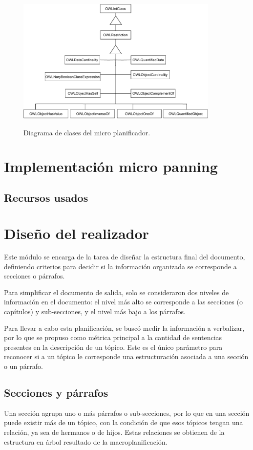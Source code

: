 \begin{figure}[H]
    \centering
    \includegraphics[width=10cm, height=7cm]{img/generacion_documento/diagrama_clases_microplanificador.pdf}
    \caption{Diagrama de clases del micro planificador.}
    \label{fig:diagrama_clases_microplanificador}
\end{figure}


\section{Implementación micro panning}

\subsection{Recursos usados}

\section{Diseño del realizador}
Este módulo se encarga de la tarea de diseñar la estructura final del documento, definiendo criterios para decidir si la información organizada se corresponde a secciones o párrafos.

Para simplificar el documento de salida, solo se consideraron dos niveles de información en el documento: el nivel más alto se corresponde a las secciones (o capítulos) y sub-secciones, y el nivel más bajo a los párrafos. 

Para llevar a cabo esta planificación, se buscó medir la información a verbalizar, por lo que se propuso como métrica principal a la cantidad de sentencias presentes en la descripción de un tópico. Este es el único parámetro para reconocer si a un tópico le corresponde una estructuración asociada a una sección o un párrafo. 

\subsection{Secciones y párrafos}
Una sección agrupa uno o más párrafos o sub-secciones, por lo que en una sección puede existir más de un tópico, con la condición de que esos tópicos tengan una relación, ya sea de hermanos o de hijos. Estas relaciones se obtienen de la estructura en árbol resultado de la macroplanificación. 

